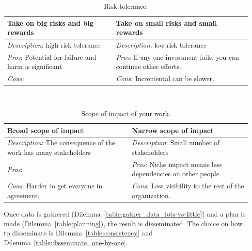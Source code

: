\begin{center}
\begin{table}[ht]
\begin{tabular}{ | m{\dilemmatablewidth}| m{\dilemmatablewidth} | } 
  \hline
  \textbf{Take on big risks and big rewards} & 
  \textbf{Take on small risks and small rewards} \\ 
  \hline
  \textit{Description}: high risk tolerance &
  \textit{Description}: low risk tolerance \\
  \hline
  \textit{Pros}: Potential for failure and harm is significant &
  \textit{Pros}: If any one investment fails, you can continue other efforts. \\
  \hline
  \textit{Cons}:  & 
  \textit{Cons}: Incremental can be slower. \\
  \hline
\end{tabular}
\caption{Risk tolerance. 
}
\label{table:risk}
\end{table}
\end{center}

\ \\

\begin{center}
\begin{table}[ht]
\begin{tabular}{ | m{\dilemmatablewidth}| m{\dilemmatablewidth} | } 
  \hline
  \textbf{Broad scope of impact} &
  \textbf{Narrow scope of impact} \\
  \hline
  \textit{Description}: The consequence of the work has many stakeholders &
  \textit{Description}: Small number of stakeholders \\  
  \hline
  \textit{Pros}:  &
  \textit{Pros}: Niche impact means less dependencies on other people. \\
  \hline
  \textit{Cons}: Harder to get everyone in agreement. & 
  \textit{Cons}: Less visibility to the rest of the organization. \\
  \hline
\end{tabular}
\caption{Scope of impact of your work. 
}
\end{table}
\label{table:scope_broad-vs-narrow}
\end{center}


Once data is gathered (Dilemma~\ref{table:gather_data_lots-vs-little}) and a plan is made (Dilemma~\ref{table:planning}), the result is disseminated. The choice on how to disseminate is Dilemma~\ref{table:consistency} and Dilemma~\ref{table:disseminate_one-by-one}.

